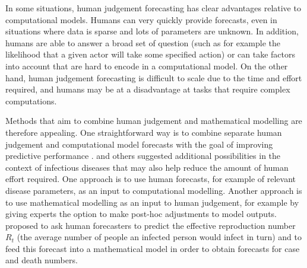 \documentclass[10pt,a4paper,twocolumn]{article}
\begin{document}
In some situations, human judgement forecasting has clear advantages relative to computational models. Humans can very quickly provide forecasts, even in situations where data is sparse and lots of parameters are unknown. In addition, humans are able to answer a broad set of question (such as for example the likelihood that a given actor will take some specified action) or can take factors into account that are hard to encode in a computational model. On the other hand, human judgement forecasting is difficult to scale due to the time and effort required, and humans may be at a disadvantage at tasks that require complex computations. 



Methods that aim to combine human judgement and mathematical modelling are therefore appealing. One straightforward way is to combine separate human judgement and computational model forecasts with the goal of improving predictive performance \citep{mcandrewChimericForecastingCombining2022}. \cite{farrowHumanJudgmentApproach2017, bosseComparingHumanModelbased2022} and others suggested additional possibilities in the context of infectious diseases that may also help reduce the amount of human effort required. One approach is to use human forecasts, for example of relevant disease parameters, as an input to computational modelling. Another approach is to use mathematical modelling as an input to human judgement, for example by giving experts the option to make post-hoc adjustments to model outputs. \citet{bosseComparingHumanModelbased2022} proposed to ask human forecasters to predict the effective reproduction number $R_t$ (the average number of people an infected person would infect in turn) and to feed this forecast into a mathematical model in order to obtain forecasts for case and death numbers. 
\end{document}
